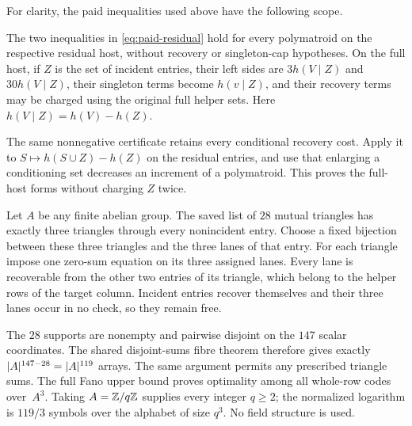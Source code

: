 For clarity, the paid inequalities used above have the following scope.
\begin{proposition}\label{prop:paid-entropy}
The two inequalities in \eqref{eq:paid-residual} hold for every polymatroid on the respective residual host, without
recovery or singleton-cap hypotheses. On the full host, if $Z$ is the set of incident entries, their left sides
are $3h(V\mid Z)$ and $30h(V\mid Z)$, their singleton terms become $h(v\mid Z)$, and their recovery terms may be
charged using the original full helper sets. Here $h(V\mid Z)=h(V)-h(Z)$.
\end{proposition}
\begin{outline}
The same nonnegative certificate retains every conditional recovery cost. Apply it to
$S\mapsto h(S\cup Z)-h(Z)$ on the residual entries, and use that enlarging a conditioning set decreases an
increment of a polymatroid. This proves the full-host forms without charging $Z$ twice.
\end{outline}

\begin{outline}
Let $A$ be any finite abelian group. The saved list of $28$ mutual triangles has exactly three triangles through
every nonincident entry. Choose a fixed bijection between these three triangles and the three lanes of that entry.
For each triangle impose one zero-sum equation on its three assigned lanes. Every lane is recoverable from the
other two entries of its triangle, which belong to the helper rows of the target column. Incident entries recover
themselves and their three lanes occur in no check, so they remain free.

The $28$ supports are nonempty and pairwise disjoint on the $147$ scalar coordinates. The shared disjoint-sums
fibre theorem therefore gives exactly $\lvert A \rvert^{147-28}=\lvert A \rvert^{119}$ arrays. The same argument permits any
prescribed triangle sums. The full Fano upper bound proves optimality among all whole-row codes over~$A^3$.
Taking $A=\mathbb{Z}/q\mathbb{Z}$ supplies every integer $q\ge2$; the normalized logarithm is $119/3$ symbols over the alphabet
of size $q^3$. No field structure is used.
\end{outline}

